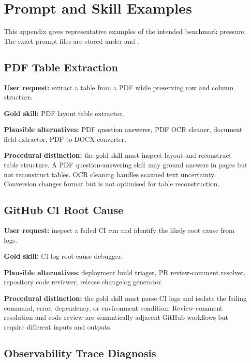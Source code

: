 \chapter{Prompt and Skill Examples}

This appendix gives representative examples of the intended benchmark pressure. The exact prompt files are stored under  and .

\section{PDF Table Extraction}

\textbf{User request:} extract a table from a PDF while preserving row and column structure.

\textbf{Gold skill:} PDF layout table extractor.

\textbf{Plausible alternatives:} PDF question answerer, PDF OCR cleaner, document field extractor, PDF-to-DOCX converter.

\textbf{Procedural distinction:} the gold skill must inspect layout and reconstruct table structure. A PDF question-answering skill may ground answers in pages but not reconstruct tables. OCR cleaning handles scanned text uncertainty. Conversion changes format but is not optimised for table reconstruction.

\section{GitHub CI Root Cause}

\textbf{User request:} inspect a failed CI run and identify the likely root cause from logs.

\textbf{Gold skill:} CI log root-cause debugger.

\textbf{Plausible alternatives:} deployment build triager, PR review-comment resolver, repository code reviewer, release changelog generator.

\textbf{Procedural distinction:} the gold skill must parse CI logs and isolate the failing command, error, dependency, or environment condition. Review-comment resolution and code review are semantically adjacent GitHub workflows but require different inputs and outputs.

\section{Observability Trace Diagnosis}

